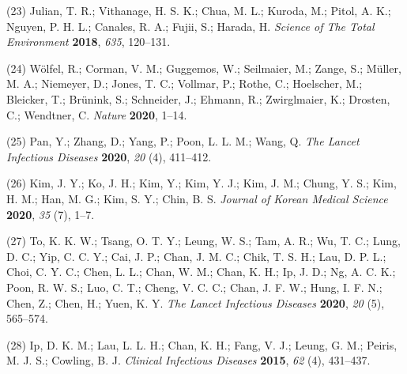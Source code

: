 \documentclass[journal=jacsat,manuscript=article]{achemso}
\begin{document}
\leavevmode\hypertarget{ref-Julian2018}{}%
(23) Julian, T. R.; Vithanage, H. S. K.; Chua, M. L.; Kuroda, M.; Pitol,
A. K.; Nguyen, P. H. L.; Canales, R. A.; Fujii, S.; Harada, H.
\emph{Science of The Total Environment} \textbf{2018}, \emph{635},
120--131.

\leavevmode\hypertarget{ref-Wolfel2020}{}%
(24) Wölfel, R.; Corman, V. M.; Guggemos, W.; Seilmaier, M.; Zange, S.;
Müller, M. A.; Niemeyer, D.; Jones, T. C.; Vollmar, P.; Rothe, C.;
Hoelscher, M.; Bleicker, T.; Brünink, S.; Schneider, J.; Ehmann, R.;
Zwirglmaier, K.; Drosten, C.; Wendtner, C. \emph{Nature} \textbf{2020},
1--14.

\leavevmode\hypertarget{ref-Pan2020}{}%
(25) Pan, Y.; Zhang, D.; Yang, P.; Poon, L. L. M.; Wang, Q. \emph{The
Lancet Infectious Diseases} \textbf{2020}, \emph{20} (4), 411--412.

\leavevmode\hypertarget{ref-Kim2020}{}%
(26) Kim, J. Y.; Ko, J. H.; Kim, Y.; Kim, Y. J.; Kim, J. M.; Chung, Y.
S.; Kim, H. M.; Han, M. G.; Kim, S. Y.; Chin, B. S. \emph{Journal of
Korean Medical Science} \textbf{2020}, \emph{35} (7), 1--7.

\leavevmode\hypertarget{ref-To2020}{}%
(27) To, K. K. W.; Tsang, O. T. Y.; Leung, W. S.; Tam, A. R.; Wu, T. C.;
Lung, D. C.; Yip, C. C. Y.; Cai, J. P.; Chan, J. M. C.; Chik, T. S. H.;
Lau, D. P. L.; Choi, C. Y. C.; Chen, L. L.; Chan, W. M.; Chan, K. H.;
Ip, J. D.; Ng, A. C. K.; Poon, R. W. S.; Luo, C. T.; Cheng, V. C. C.;
Chan, J. F. W.; Hung, I. F. N.; Chen, Z.; Chen, H.; Yuen, K. Y.
\emph{The Lancet Infectious Diseases} \textbf{2020}, \emph{20} (5),
565--574.

\leavevmode\hypertarget{ref-Ip2016}{}%
(28) Ip, D. K. M.; Lau, L. L. H.; Chan, K. H.; Fang, V. J.; Leung, G.
M.; Peiris, M. J. S.; Cowling, B. J. \emph{Clinical Infectious Diseases}
\textbf{2015}, \emph{62} (4), 431--437.
\end{document}
